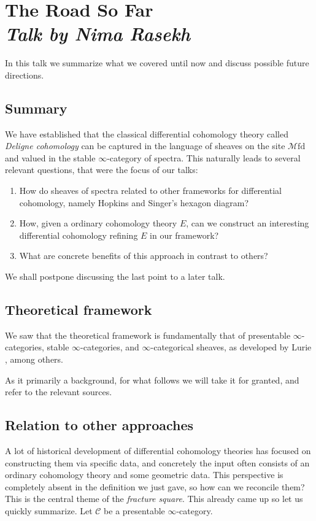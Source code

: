 \documentclass[a4paper]{book}
\newcommand{\lC}{\mathcal{C}}
\newcommand{\lM}{\mathcal{M}}
\newcommand{\Mfd}{\lM\mathrm{fd}} %
\newcommand{\nrnote}[1]{\todo[color=green!40,linecolor=green!40!black,size=\tiny]{#1}}
\theoremstyle{definition}
\theoremstyle{remark}
\numberwithin{equation}{section}
\begin{document}
\chapter{The Road So Far \texorpdfstring{\\}{ } \normalsize \emph{Talk by Nima Rasekh}}

In this talk we summarize what we covered until now and discuss possible future directions.

\section {Summary}

We have established that the classical differential cohomology theory called \emph{Deligne cohomology} can be captured in the language of sheaves on the site $\Mfd$ and valued in the stable $\infty$-category of spectra. This naturally leads to several relevant questions, that were the focus of our talks:
\begin{enumerate}
  \item How do sheaves of spectra related to other frameworks for differential cohomology, namely Hopkins and Singer's hexagon diagram\nrnote{citation}?
  \item How, given a ordinary cohomology theory $E$, can we construct an interesting differential cohomology refining $E$ in our framework?
  \item What are concrete benefits of this approach in contrast to others? 
\end{enumerate} We shall postpone discussing the last point to a later talk. 

\section{Theoretical framework}

We saw that the theoretical framework is fundamentally that of presentable $\infty$-categories, stable $\infty$-categories, and $\infty$-categorical sheaves, as developed by Lurie \cite{lurie2009htt}, among others. 

As it primarily a background, for what follows we will take it for granted, and refer to the relevant sources.

\section{Relation to other approaches}
A lot of historical development of differential cohomology theories has focused on constructing them via specific data, and concretely the input often consists of an ordinary cohomology theory and some geometric data. This perspective is completely absent in the definition we just gave, so how can we reconcile them? This is the central theme of the \emph{fracture square}. This already came up so let us quickly summarize. Let $\lC$ be a presentable $\infty$-category. 
\end{document}
